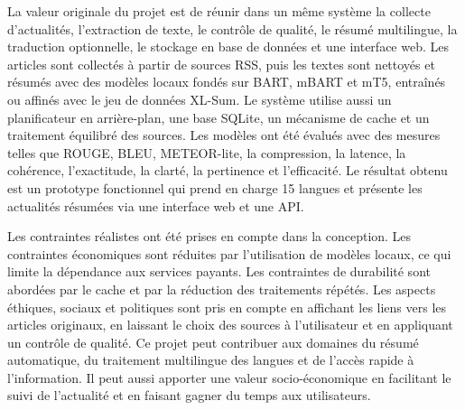La valeur originale du projet est de réunir dans un même système la collecte d’actualités, l’extraction de texte, le contrôle de qualité, le résumé multilingue, la traduction optionnelle, le stockage en base de données et une interface web. Les articles sont collectés à partir de sources RSS, puis les textes sont nettoyés et résumés avec des modèles locaux fondés sur BART, mBART et mT5, entraînés ou affinés avec le jeu de données XL-Sum. Le système utilise aussi un planificateur en arrière-plan, une base SQLite, un mécanisme de cache et un traitement équilibré des sources. Les modèles ont été évalués avec des mesures telles que ROUGE, BLEU, METEOR-lite, la compression, la latence, la cohérence, l’exactitude, la clarté, la pertinence et l’efficacité. Le résultat obtenu est un prototype fonctionnel qui prend en charge 15 langues et présente les actualités résumées via une interface web et une API.

Les contraintes réalistes ont été prises en compte dans la conception. Les contraintes économiques sont réduites par l’utilisation de modèles locaux, ce qui limite la dépendance aux services payants. Les contraintes de durabilité sont abordées par le cache et par la réduction des traitements répétés. Les aspects éthiques, sociaux et politiques sont pris en compte en affichant les liens vers les articles originaux, en laissant le choix des sources à l’utilisateur et en appliquant un contrôle de qualité. Ce projet peut contribuer aux domaines du résumé automatique, du traitement multilingue des langues et de l’accès rapide à l’information. Il peut aussi apporter une valeur socio-économique en facilitant le suivi de l’actualité et en faisant gagner du temps aux utilisateurs.